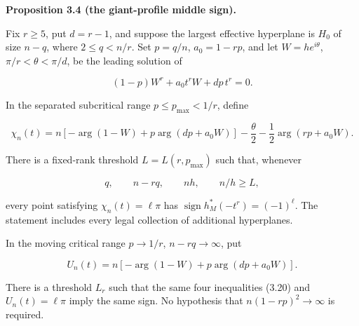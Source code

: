 \documentclass[10pt]{article}
\newenvironment{mdstatement}[1]
  {\par\Needspace{0.16\textheight}\noindent\textbf{#1.}\ \itshape}
  {\par\normalfont}
\begin{document}
\begin{mdstatement}{Proposition 3.4 (the giant-profile middle sign)}


Fix $r\ge5$, put $d=r-1$, and suppose the largest effective hyperplane is
$H_0$ of size $n-q$, where $2\le q<n/r$.  Set
$p=q/n$, $a_0=1-rp$, and let
$W=h e^{i\theta}$, $\pi/r<\theta<\pi/d$, be the leading solution of

\[
 (1-p)W^r+a_0t^rW+dp\,t^r=0. \tag{3.18}
\]

In the separated subcritical range $p\le p_{\max}<1/r$, define

\[
 \chi_n(t)=n[-\arg(1-W)+p\arg(dp+a_0W)]
 -\frac\theta2-\frac12\arg(rp+a_0W). \tag{3.19}
\]

There is a fixed-rank threshold $L=L(r,p_{\max})$ such that, whenever

\[
 q,\qquad n-rq,\qquad nh,\qquad n/h\ge L, \tag{3.20}
\]

every point satisfying $\chi_n(t)=\ell\pi$ has
$\operatorname{sign}h_M^*(-t^r)=(-1)^\ell$.  The statement includes every
legal collection of additional hyperplanes.

In the moving critical range $p\to1/r$, $n-rq\to\infty$, put

\[
 U_n(t)=n[-\arg(1-W)+p\arg(dp+a_0W)]. \tag{3.21}
\]

There is a threshold $L_r$ such that the same four inequalities (3.20) and
$U_n(t)=\ell\pi$ imply the same sign.  No hypothesis that
$n(1-rp)^2\to\infty$ is required.

\end{mdstatement}
\end{document}
